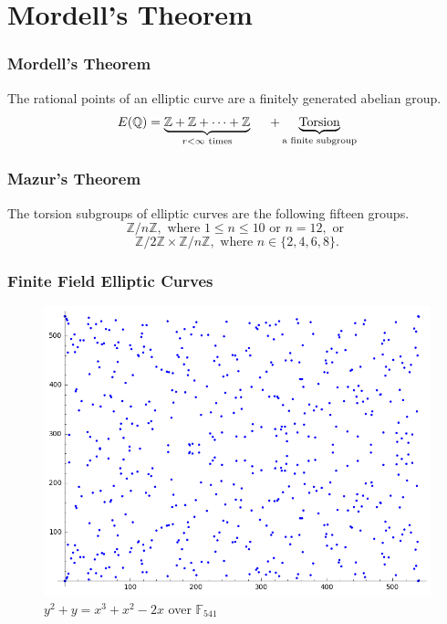 \documentclass{beamer}
\newcommand{\Q}{\mathbb{Q}}
\newcommand{\F}{\mathbb{F}}
\newcommand{\Z}{\mathbb{Z}}
\begin{document}
\section{Mordell's Theorem}
\begin{frame}
\frametitle{Mordell's Theorem}
The rational points of an elliptic curve are a finitely 
generated abelian group.
{\Large 
\[ E(\Q) = \underbrace{\Z + \Z + \cdots + \Z}_{r < \infty \text{ times}}  \hspace{.5cm} + \underbrace{\text{Torsion}}_{\text{a finite subgroup}} \]
}
\end{frame}

\begin{frame}
\frametitle{Mazur's Theorem}
The torsion
subgroups of elliptic curves are the following fifteen groups.
\[ \mathbb Z / n \mathbb Z, \text{ where } 1 \leq n \leq 10 \text{ or } n = 12, \text{ or }\]
\[ \mathbb Z / 2 \mathbb Z \times \mathbb Z / n \mathbb Z, \text{ where }
n \in \{ 2, 4, 6, 8 \}. \]
\end{frame}

\begin{frame}
\frametitle{Finite Field Elliptic Curves}
\begin{figure}[H]
\centering
\includegraphics[width=.6\textwidth]{389a-finite-field-points}
\caption{$y^2 + y = x^{3} + x^{2} - 2 x$ over $\F_{541}$}
\end{figure}
\end{frame}
\end{document}
